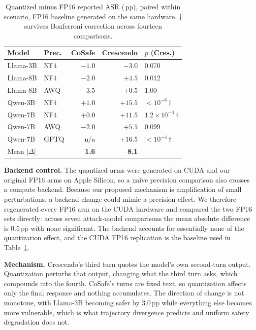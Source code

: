 \documentclass[10pt,twocolumn]{article}
\newcommand{\pp}{\,pp}
\begin{document}
\begin{table}[t]
\centering
\caption{Quantized minus FP16 reported ASR (\pp), paired within scenario, FP16
baseline generated on the same hardware. $\dagger$ survives Bonferroni correction
across fourteen comparisons.}
\label{tab:quant}
\small
\begin{tabular}{llrrl}
\toprule
Model & Prec. & CoSafe & Crescendo & $p$ (Cres.) \\
\midrule
Llama-3B  & NF4  & $-1.0$ & $-3.0$  & 0.070 \\
Llama-8B  & NF4  & $-2.0$ & $+4.5$  & 0.012 \\
Llama-8B  & AWQ  & $-3.5$ & $+0.5$  & 1.00 \\
Qwen-3B   & NF4  & $+1.0$ & $+15.5$ & $<10^{-6}$\,$\dagger$ \\
Qwen-7B   & NF4  & $+0.0$ & $+11.5$ & $1.2{\times}10^{-4}$\,$\dagger$ \\
Qwen-7B   & AWQ  & $-2.0$ & $+5.5$  & 0.099 \\
Qwen-7B   & GPTQ & n/a    & $+16.5$ & $<10^{-4}$\,$\dagger$ \\
\midrule
\multicolumn{2}{l}{Mean $|\Delta|$} & \textbf{1.6} & \textbf{8.1} & \\
\bottomrule
\end{tabular}
\end{table}

\textbf{Backend control.} The quantized arms were generated on CUDA and our
original FP16 arms on Apple Silicon, so a naive precision comparison also crosses
a compute backend. Because our proposed mechanism is amplification of small
perturbations, a backend change could mimic a precision effect. We therefore
regenerated every FP16 arm on the CUDA hardware and compared the two FP16 sets
directly: across seven attack-model comparisons the mean absolute difference is
$0.5$\pp{} with none significant. The backend accounts for essentially none of
the quantization effect, and the CUDA FP16 replication is the baseline used in
Table~\ref{tab:quant}.

\textbf{Mechanism.} Crescendo's third turn quotes the model's own second-turn
output. Quantization perturbs that output, changing what the third turn asks,
which compounds into the fourth. CoSafe's turns are fixed text, so quantization
affects only the final response and nothing accumulates. The direction of change
is not monotone, with Llama-3B becoming safer by $3.0$\pp{} while everything else
becomes more vulnerable, which is what trajectory divergence predicts and uniform
safety degradation does not.
\end{document}
